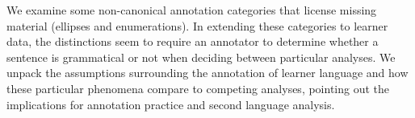 We examine some non-canonical annotation categories that license missing material (ellipses and enumerations).  In extending these categories to learner data, the distinctions seem to require an annotator to determine whether a sentence is grammatical or not when deciding between particular analyses.  We unpack the assumptions surrounding the annotation of learner language and how these particular phenomena compare to competing analyses, pointing out the implications for annotation practice and second language analysis.
